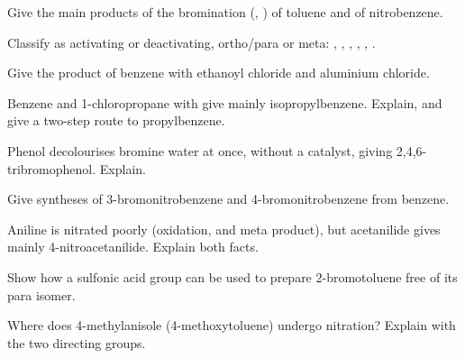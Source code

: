 \begin{exercise}[$\star$]\label{exo:b2:aromatic-substitution:2}
Give the main products of the bromination (, ) of toluene and of
nitrobenzene.
\end{exercise}

\begin{exercise}[$\star$]\label{exo:b2:aromatic-substitution:3}
Classify as activating or deactivating, ortho/para or meta: , , ,
, , .
\end{exercise}

\begin{exercise}[$\star$]\label{exo:b2:aromatic-substitution:4}
Give the product of benzene with ethanoyl chloride and aluminium chloride.
\end{exercise}

\begin{exercise}[$\star\star$]\label{exo:b2:aromatic-substitution:5}
Benzene and 1-chloropropane with  give mainly isopropylbenzene. Explain, and give a
two-step route to propylbenzene.
\end{exercise}

\begin{exercise}[$\star\star$]\label{exo:b2:aromatic-substitution:6}
Phenol decolourises bromine water at once, without a catalyst, giving
2,4,6-tribromophenol. Explain.
\end{exercise}

\begin{exercise}[$\star\star$]\label{exo:b2:aromatic-substitution:7}
Give syntheses of 3-bromonitrobenzene and 4-bromonitrobenzene from benzene.
\end{exercise}

\begin{exercise}[$\star\star$]\label{exo:b2:aromatic-substitution:8}
Aniline is nitrated poorly (oxidation, and meta product), but acetanilide gives mainly
4-nitroacetanilide. Explain both facts.
\end{exercise}

\begin{exercise}[$\star\star$]\label{exo:b2:aromatic-substitution:9}
Show how a sulfonic acid group can be used to prepare 2-bromotoluene free of its para isomer.
\end{exercise}

\begin{exercise}[$\star\star\star$]\label{exo:b2:aromatic-substitution:10}
Where does 4-methylanisole (4-methoxytoluene) undergo nitration? Explain with the two
directing groups.
\end{exercise}

